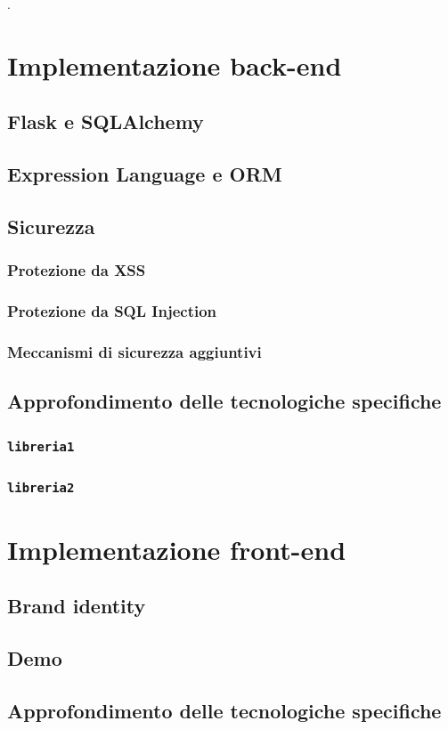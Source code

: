 \documentclass{report}
\begin{document}
.
\chapter{Implementazione back-end}
\section{Flask e SQLAlchemy}
\section{Expression Language e ORM}
\section{Sicurezza}
\subsection{Protezione da XSS}
\subsection{Protezione da SQL Injection}
\subsection{Meccanismi di sicurezza aggiuntivi}
\section{Approfondimento delle tecnologiche specifiche}
\subsection{\texttt{libreria1} }
\subsection{\texttt{libreria2} }

\chapter{Implementazione front-end}
\section{Brand identity}
\section{Demo}
\section{Approfondimento delle tecnologiche specifiche}
\end{document}

